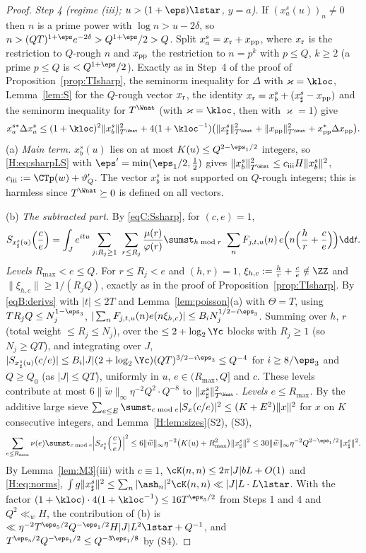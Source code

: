 \begin{proof}
\emph{Step 4 (regime (iii); $u>(1+\eps)\lstar$, $y=a$).} If $(x_a^s(u))_n\ne0$ then $n$ is a prime power with $\log n>u-2\delta$, so $n>(QT)^{1+\eps}e^{-2\delta}>Q^{1+\eps}/2>Q$. Split $x_a^s=x_{\rm r}+x_{\rm pp}$, where $x_{\rm r}$ is the restriction to $Q$-rough $n$ and $x_{\rm pp}$ the restriction to $n=p^k$ with $p\le Q$, $k\ge2$ (a prime $p\le Q$ is $<Q^{1+\eps}/2$). Exactly as in Step~4 of the proof of Proposition~\ref{prop:TIsharp}, the seminorm inequality for $\Delta$ with $\varkappa=\kloc$, Lemma~\ref{lem:S} for the $Q$-rough vector $x_{\rm r}$, the identity $x_{\rm r}=x_b^s+(x_\sharp^s-x_{\rm pp})$ and the seminorm inequality for $T^\Wnat$ (with $\varkappa=\kloc$, then with $\varkappa=1$) give
\[
x_a^{s*}\Delta x_a^s\le(1+\kloc)^2\|x_b^s\|^2_{T^\Wnat}+4(1+\kloc^{-1})\big(\|x_\sharp^s\|^2_{T^\Wnat}+\|x_{\rm pp}\|^2_{T^\Wnat}+x_{\rm pp}^*\Delta x_{\rm pp}\big).
\]
(a) \emph{Main term.} $x_b^s(u)$ lies on at most $K(u)\le Q^{2-\eps_1/2}$ integers, so \eqref{H:eq:sharpLS} with $\eps'=\min(\eps_1/2,\frac12)$ gives $\|x_b^s\|^2_{T^\Wnat}\le c_{\rm iii}H\|x_b^s\|^2$, $c_{\rm iii}:=\CTp(w)+\vartheta'_Q$. The vector $x_b^s$ is not supported on $Q$-rough integers; this is harmless since $T^\Wnat\succeq0$ is defined on all vectors.

(b) \emph{The subtracted part.} By \eqref{eqC:Ssharp}, for $(c,e)=1$,
\[
S_{x_\sharp^s(u)}\Big(\frac ce\Big)=\int_Je^{itu}\sum_{j:R_j\ge1}\ \sum_{r\le R_j}\frac{\mu(r)}{\varphi(r)}\sumst_{h\bmod r}\ \sum_nF_{j,t,u}(n)\,e\Big(n\Big(\frac hr+\frac ce\Big)\Big)\dd t .
\]
\emph{Levels $R_{\max}<e\le Q$.} For $r\le R_j<e$ and $(h,r)=1$, $\xi_{h,c}:=\frac hr+\frac ce\notin\ZZ$ and $\|\xi_{h,c}\|\ge1/(R_jQ)$, exactly as in the proof of Proposition~\ref{prop:TIsharp}. By \eqref{eqB:derivs} with $|t|\le2T$ and Lemma~\ref{lem:poisson}(a) with $\Theta=T$, using $TR_jQ\le N_j^{1-\eps_3}$,
$|\sum_nF_{j,t,u}(n)e(n\xi_{h,c})|\le B_iN_j^{1/2-i\eps_3}$. Summing over $h$, $r$ (total weight $\le R_j\le N_j$), over the $\le2+\log_2\Yc$ blocks with $R_j\ge1$ (so $N_j\ge QT$), and integrating over $J$,
$|S_{x_\sharp^s(u)}(c/e)|\le B_i|J|(2+\log_2\Yc)(QT)^{3/2-i\eps_3}\le Q^{-4}$ for $i\ge8/\eps_3$ and $Q\ge Q_0$ (as $|J|\le QT$), uniformly in $u$, $e\in(R_{\max},Q]$ and $c$. These levels contribute at most $6\|\widetilde w\|_\infty\eta^{-2}Q^2\cdot Q^{-8}$ to $\|x_\sharp^s\|^2_{T^\Wnat}$.
\emph{Levels $e\le R_{\max}$.} By the additive large sieve $\sum_{e\le E}\sumst_{c\bmod e}|S_x(c/e)|^2\le(K+E^2)\|x\|^2$ \cite[Thm.~7.7]{IK04} for $x$ on $K$ consecutive integers, and Lemma~\ref{H:lem:sizes}(S2), (S3),
\[
\sum_{e\le R_{\max}}\nu(e)\sumst_{c\bmod e}\Big|S_{x_\sharp^s}\Big(\frac ce\Big)\Big|^2\le6\|\widetilde w\|_\infty\eta^{-2}\big(K(u)+R_{\max}^2\big)\|x_\sharp^s\|^2\le30\|\widetilde w\|_\infty\eta^{-2}Q^{2-\eps_1/2}\|x_\sharp^s\|^2 .
\]
By Lemma~\ref{lem:M3}(iii) with $c\equiv1$, $\cK(n,n)\le2\pi|J|bL+O(1)$ and \eqref{H:eq:norms}, $\int g\|x_\sharp^s\|^2\le\sum_n|\ash_n|^2\cK(n,n)\ll|J|L\cdot L\lstar$. With the factor $(1+\kloc)\cdot4(1+\kloc^{-1})\le16T^{\eps_5/2}$ from Steps 1 and 4 and $Q^2\ll_wH$, the contribution of (b) is $\ll\eta^{-2}T^{\eps_5/2}Q^{-\eps_1/2}H|J|L^2\lstar+Q^{-1}$, and $T^{\eps_5/2}Q^{-\eps_1/2}\le Q^{-3\eps_1/8}$ by (S4).


\end{proof}
